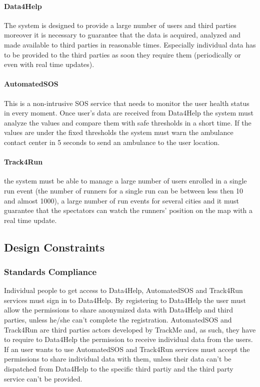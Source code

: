 \documentclass[a4paper]{article}
\begin{document}
    \paragraph{Data4Help} The system is designed to provide a large number of users and third parties moreover it is necessary to guarantee that the data is acquired, analyzed and made available to third parties in reasonable times. Especially individual data has to be provided to the third parties as soon they require them (periodically or even with real time updates).
    
    \paragraph{AutomatedSOS} This is a non-intrusive SOS service that needs to monitor the user health status in every moment. Once user's data are received from Data4Help the system must analyze the values and compare them with safe thresholds in a short time. If the values are under the fixed thresholds the system must warn the ambulance contact center in 5 seconds to send an ambulance to the user location.
    
    \paragraph{Track4Run} the system must be able to manage a large number of users enrolled in a single run event (the number of runners for a single run can be between less then 10 and almost 1000), a large number of run events for several cities and it must guarantee that the spectators can watch the runners' position on the map with a real time update.
    
    
    \subsection{Design Constraints}
    
    \subsubsection{Standards Compliance}
    
    Individual people to get access to Data4Help, AutomatedSOS and Track4Run services must sign in to Data4Help. By registering to Data4Help the user must allow the permissions to share anonymized data with Data4Help and third parties, unless he/she can't complete the registration.
    AutomatedSOS and Track4Run are third parties actors developed by TrackMe and, as such, they have to require to Data4Help the permission to receive individual data from the users.
    If an user wants to use AutomatedSOS and Track4Run services must accept the permissions to share individual data with them, unless their data can't be dispatched from Data4Help to the specific third partiy and the third party service can't be provided.
    
\end{document}

